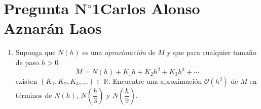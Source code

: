 \section{Pregunta N$^{\circ}$1\qquad Carlos Alonso Aznarán Laos}



\begin{frame}
    \begin{enumerate}\setcounter{enumi}{0}
        \item

              Suponga que $N\left(h\right)$ es una
              \emph{aproximación} de $M$ y que para cualquier tamaño
              de paso $h>0$
              \begin{equation}\label{eq:richardson}
                  M=
                  N\left(h\right)+
                  K_{1}h+
                  K_{2}h^{2}+
                  K_{3}h^{3}+
                  \cdots
              \end{equation}
              existen
              \begin{math}
                  \left\{
                  K_{1},
                  K_{2},
                  K_{3},
                  \dotsc
                  \right\}\subset
                  \mathbb{R}
              \end{math}.
              Encuentre una aproximación
              $\mathcal{O}\left(h^3\right)$ de $M$ en términos de
              \begin{math}
                  N\left(h\right)
              \end{math},
              \begin{math}
                  N\left(\dfrac{h}{3}\right)
              \end{math}
              y
              \begin{math}
                  N\left(\dfrac{h}{9}\right)
              \end{math}.
    \end{enumerate}


\end{frame}
